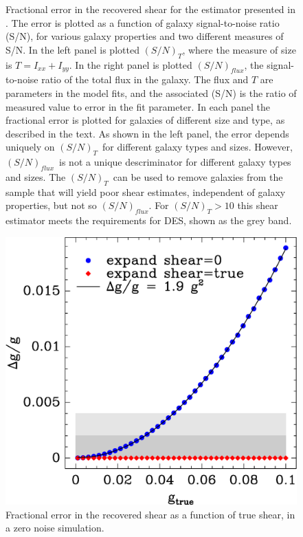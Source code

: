\documentclass[12pt,preprint]{aastex}
\newcommand{\Tsn}{$(S/N)_T$}
\newcommand{\fsn}{$(S/N)_{flux}$}
\begin{document}
\begin{figure}[t]
 \caption{ Fractional error in the recovered shear for the estimator presented
     in \cite{ba13}.  The error is plotted as a function of galaxy
     signal-to-noise ratio (S/N), for various galaxy properties and two
     different measures of S/N.  In the left panel is plotted \Tsn, where the
     measure of size is $T=I_{xx} + I_{yy}$.  In the right panel is plotted
     \fsn, the signal-to-noise ratio of the total flux in the galaxy.  The flux
     and $T$ are parameters in the model fits, and the associated (S/N) is the
     ratio of measured value to error in the fit parameter.  In each panel the
     fractional error is plotted for galaxies of different size and type, as
     described in the text.  As shown in the left panel, the error depends
     uniquely on \Tsn\ for different galaxy types and sizes.  However, \fsn\ is
     not a unique descriminator for different galaxy types and sizes.   The
     \Tsn\ can be used to remove galaxies from the sample that will yield poor
 shear estimates, independent of galaxy properties, but not so \fsn.  For \Tsn$
 > 10$ this shear estimator meets the requirements for DES, shown as the grey
 band.  \label{fig:fracerr}}

\end{figure}


\begin{figure}[t] \centering
 \centering 
 \includegraphics[scale=0.6]{figures/fracerr-vs-shear.eps}

 \caption{Fractional error in the recovered shear as a function
 of true shear, in a zero noise simulation.\label{fig:nonoise}}

\end{figure}
\end{document}
